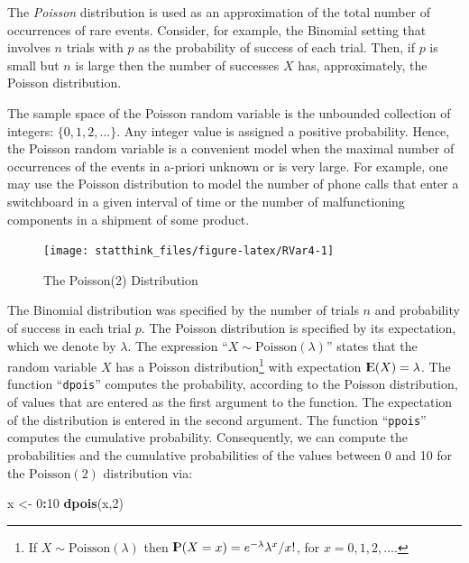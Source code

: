 \documentclass[]{krantz}
\makeatletter
\newenvironment{Shaded}{\begin{snugshade}}{\end{snugshade}}
\newcommand{\DecValTok}[1]{\textcolor[rgb]{0.00,0.00,0.81}{#1}}
\newcommand{\KeywordTok}[1]{\textcolor[rgb]{0.13,0.29,0.53}{\textbf{#1}}}
\newcommand{\NormalTok}[1]{#1}
\newcommand{\OperatorTok}[1]{\textcolor[rgb]{0.81,0.36,0.00}{\textbf{#1}}}
\newcommand{\StringTok}[1]{\textcolor[rgb]{0.31,0.60,0.02}{#1}}
\newcommand{\Expec}{{\rm I\kern-.3em E}}
\newcommand{\Prob}{{\rm I\kern-.3em P}}
\newenvironment{kframe}{%
\medskip{}
\setlength{\fboxsep}{.8em}
 \def\at@end@of@kframe{}%
 \ifinner\ifhmode%
  \def\at@end@of@kframe{\end{minipage}}%
  \begin{minipage}{\columnwidth}%
 \fi\fi%
 \def\FrameCommand##1{\hskip\@totalleftmargin \hskip-\fboxsep
 \colorbox{shadecolor}{##1}\hskip-\fboxsep
     \hskip-\linewidth \hskip-\@totalleftmargin \hskip\columnwidth}%
 \MakeFramed {\advance\hsize-\width
   \@totalleftmargin\z@ \linewidth\hsize
   \@setminipage}}%
 {\par\unskip\endMakeFramed%
 \at@end@of@kframe}
\renewenvironment{Shaded}{\begin{kframe}}{\end{kframe}}
\theoremstyle{definition}
\theoremstyle{definition}
\theoremstyle{definition}
\theoremstyle{remark}
\makeatother
\begin{document}
The \emph{Poisson} distribution is used as an approximation of the total
number of occurrences of rare events. Consider, for example, the
Binomial setting that involves \(n\) trials with \(p\) as the probability of
success of each trial. Then, if \(p\) is small but \(n\) is large then the
number of successes \(X\) has, approximately, the Poisson distribution.

The sample space of the Poisson random variable is the unbounded
collection of integers: \(\{0,1,2, \ldots\}\). Any integer value is
assigned a positive probability. Hence, the Poisson random variable is a
convenient model when the maximal number of occurrences of the events in
a-priori unknown or is very large. For example, one may use the Poisson
distribution to model the number of phone calls that enter a switchboard
in a given interval of time or the number of malfunctioning components
in a shipment of some product.

\begin{figure}

{\centering \texttt{[image: statthink\_files/figure-latex/RVar4-1]} 

}

\caption{The Poisson(2) Distribution}\label{fig:RVar4}
\end{figure}

The Binomial distribution was specified by the number of trials \(n\) and
probability of success in each trial \(p\). The Poisson distribution is
specified by its expectation, which we denote by \(\lambda\). The
expression ``\(X \sim \mathrm{Poisson}(\lambda)\)'' states that the random
variable \(X\) has a Poisson distribution\footnote{If \(X \sim \mathrm{Poisson}(\lambda)\) then
  \(\Prob(X=x) = e^{-\lambda}\lambda^x/x!\), for \(x=0,1,2,\ldots\).} with expectation
\(\Expec(X) = \lambda\). The function ``\texttt{dpois}'' computes the probability,
according to the Poisson distribution, of values that are entered as the
first argument to the function. The expectation of the distribution is
entered in the second argument. The function ``\texttt{ppois}'' computes the
cumulative probability. Consequently, we can compute the probabilities
and the cumulative probabilities of the values between 0 and 10 for the
\(\mathrm{Poisson}(2)\) distribution via:

\begin{Shaded}
\begin{Highlighting}[]
\NormalTok{x <-}\StringTok{ }\DecValTok{0}\OperatorTok{:}\DecValTok{10}
\KeywordTok{dpois}\NormalTok{(x,}\DecValTok{2}\NormalTok{)}
\end{Highlighting}
\end{Shaded}
\end{document}
